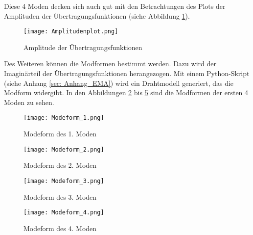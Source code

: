     \noindent
    Diese 4 Moden decken sich auch gut mit den Betrachtungen des Plots der
    Amplituden der Übertragungsfunktionen (siehe Abbildung
    \ref{fig: Amplitudenplot}).

    \begin{figure}[H]
        \centering
        \texttt{[image: Amplitudenplot.png]}
        \caption{Amplitude der Übertragungsfunktionen}
        \label{fig: Amplitudenplot}
    \end{figure}

    \noindent
    Des Weiteren können die Modformen bestimmt werden. Dazu wird der
    Imaginärteil der Übertragungsfunktionen herangezogen. Mit einem
    Python-Skript (siehe Anhang \ref{sec: Anhang_EMA}) wird ein Drahtmodell
    generiert, das die Modform widergibt. In den Abbildungen
    \ref{fig: Modeform_1} bis \ref{fig: Modeform_4} sind die Modformen
    der ersten 4 Moden zu sehen.

    \begin{figure}[H]
        \centering
        \texttt{[image: Modeform\_1.png]}
        \caption{Modeform des 1. Moden}
        \label{fig: Modeform_1}
    \end{figure}

    \begin{figure}[H]
        \centering
        \texttt{[image: Modeform\_2.png]}
        \caption{Modeform des 2. Moden}
        \label{fig: Modeform_2}
    \end{figure}

    \begin{figure}[H]
        \centering
        \texttt{[image: Modeform\_3.png]}
        \caption{Modeform des 3. Moden}
        \label{fig: Modeform_3}
    \end{figure}

    \begin{figure}[H]
        \centering
        \texttt{[image: Modeform\_4.png]}
        \caption{Modeform des 4. Moden}
        \label{fig: Modeform_4}
    \end{figure}

    